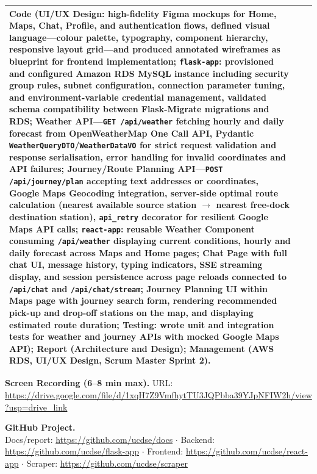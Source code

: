 \documentclass[11pt,a4paper]{article}
\begin{document}
\begin{longtable}{@{}p{2.2cm}p{1cm}p{11.5cm}@{}}
\textbf{Code} (UI/UX Design: high-fidelity Figma mockups for Home, Maps, Chat, Profile, and authentication flows, defined visual language---colour palette, typography, component hierarchy, responsive layout grid---and produced annotated wireframes as blueprint for frontend implementation; \texttt{flask-app}: provisioned and configured Amazon RDS MySQL instance including security group rules, subnet configuration, connection parameter tuning, and environment-variable credential management, validated schema compatibility between Flask-Migrate migrations and RDS; Weather API---\texttt{GET /api/weather} fetching hourly and daily forecast from OpenWeatherMap One Call API, Pydantic \texttt{WeatherQueryDTO}/\texttt{WeatherDataVO} for strict request validation and response serialisation, error handling for invalid coordinates and API failures; Journey/Route Planning API---\texttt{POST /api/journey/plan} accepting text addresses or coordinates, Google Maps Geocoding integration, server-side optimal route calculation (nearest available source station $\rightarrow$ nearest free-dock destination station), \texttt{api\_retry} decorator for resilient Google Maps API calls; \texttt{react-app}: reusable Weather Component consuming \texttt{/api/weather} displaying current conditions, hourly and daily forecast across Maps and Home pages; Chat Page with full chat UI, message history, typing indicators, SSE streaming display, and session persistence across page reloads connected to \texttt{/api/chat} and \texttt{/api/chat/stream}; Journey Planning UI within Maps page with journey search form, rendering recommended pick-up and drop-off stations on the map, and displaying estimated route duration; Testing: wrote unit and integration tests for weather and journey APIs with mocked Google Maps API); 
\textbf{Report} (Architecture and Design); 
\textbf{Management} (AWS RDS, UI/UX Design, Scrum Master Sprint 2). \\
\bottomrule
\end{longtable}
\normalsize

\vspace{1em}

\noindent\textbf{Screen Recording (6--8 min max).} URL: \url{https://drive.google.com/file/d/1xqH7Z9VmfhytTU3JQPbba39YJpNFIW2h/view?usp=drive_link}

\vspace{0.5em}

\noindent\textbf{GitHub Project.}\\
Docs/report: \url{https://github.com/ucdse/docs} $\cdot$ Backend: \url{https://github.com/ucdse/flask-app} $\cdot$ Frontend: \url{https://github.com/ucdse/react-app} $\cdot$ Scraper: \url{https://github.com/ucdse/scraper}
\end{document}
